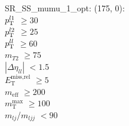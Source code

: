 SR\_SS\_mumu\_1\_opt: (175, 0): \\
$p_{\text{T}}^{l1}$ $\geq 30$ \\
$p_{\text{T}}^{l2}$ $\geq 25$ \\
$p_{\text{T}}^{ll}$ $\geq 60$ \\
$m_{T2}$ $\geq 75$ \\
$|\Delta\eta_{ll}|$ $<1.5$ \\
$E_{\text{T}}^{\text{miss,rel}}$ $\geq 5$ \\
$m_{\text{eff}}$ $\geq 200$ \\
$m_{\text{T}}^{\text{max}}$ $\geq 100$ \\
$m_{lj}$/$m_{ljj}$ $<90$ \\
